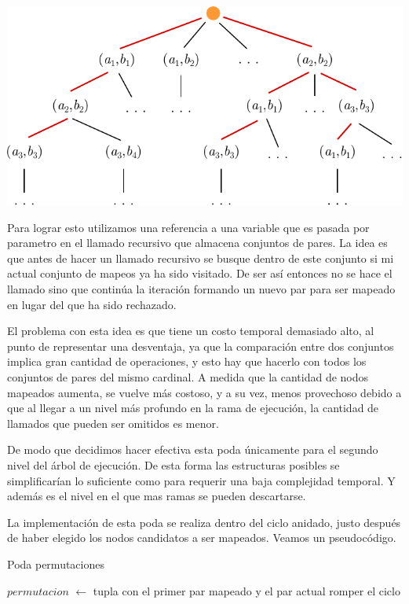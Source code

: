 \begin{center}
\includegraphics[width=.7\textwidth]{imagenes/ex2_execution_tree.pdf}
\end{center}

Para lograr esto utilizamos una referencia a una variable que es pasada por
parametro en el llamado recursivo que almacena conjuntos de pares. La idea es
que antes de hacer un llamado recursivo se busque dentro de este conjunto
si mi actual conjunto de mapeos ya ha sido visitado. De ser así entonces no se
hace el llamado sino que continúa la iteración formando un nuevo par para ser
mapeado en lugar del que ha sido rechazado.

El problema con esta idea es que tiene un costo temporal demasiado alto, al
punto de representar una desventaja, ya que la comparación entre dos conjuntos
implica gran cantidad de operaciones, y esto hay que hacerlo con todos los
conjuntos de pares del mismo cardinal. A medida que la cantidad de nodos
mapeados aumenta, se vuelve más costoso, y a su vez, menos provechoso debido
a que al llegar a un nivel más profundo en la rama de ejecución, la cantidad
de llamados que pueden ser omitidos es menor.

De modo que decidimos hacer efectiva esta poda únicamente para el segundo
nivel del árbol de ejecución. De esta forma las estructuras posibles se
simplificarían lo suficiente como para requerir una baja complejidad temporal.
Y además es el nivel en el que mas ramas se pueden descartarse.

La implementación de esta poda se realiza dentro del ciclo anidado, justo
después de haber elegido los nodos candidatos a ser mapeados. Veamos un
pseudocódigo.

\begin{algorithm}
    \caption{Poda permutaciones}
     {
        $permutacion$ $\gets$ tupla con el primer par mapeado y el par actual \;
         {
            romper el ciclo \;
        }
    }
\end{algorithm}

